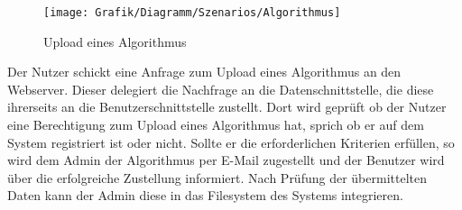 

\begin{figure}[h]
	\hspace{-0.25\linewidth}\texttt{[image: Grafik/Diagramm/Szenarios/Algorithmus]}
	\caption[]{Upload eines Algorithmus}
\end{figure}
\noindent Der Nutzer schickt eine Anfrage zum Upload eines Algorithmus an den Webserver. Dieser delegiert die Nachfrage an die Datenschnittstelle, die diese ihrerseits an die Benutzerschnittstelle zustellt. Dort wird geprüft ob der Nutzer eine Berechtigung zum Upload eines Algorithmus hat, sprich ob er auf dem System registriert ist oder nicht. Sollte er die erforderlichen Kriterien erfüllen, so wird dem Admin der Algorithmus per E-Mail zugestellt und der Benutzer wird über die erfolgreiche Zustellung informiert. Nach Prüfung der übermittelten Daten kann der Admin diese in das Filesystem des Systems integrieren.